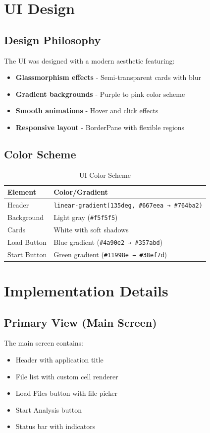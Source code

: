 \documentclass[12pt,a4paper]{report}
\begin{document}
\section{UI Design}

\subsection{Design Philosophy}
The UI was designed with a modern aesthetic featuring:
\begin{itemize}
    \item \textbf{Glassmorphism effects} - Semi-transparent cards with blur
    \item \textbf{Gradient backgrounds} - Purple to pink color scheme
    \item \textbf{Smooth animations} - Hover and click effects
    \item \textbf{Responsive layout} - BorderPane with flexible regions
\end{itemize}

\subsection{Color Scheme}
\begin{table}[H]
\centering
\begin{tabularx}{\textwidth}{|l|X|}
\hline
\textbf{Element} & \textbf{Color/Gradient} \\
\hline
Header & \texttt{linear-gradient(135deg, \#667eea → \#764ba2)} \\
\hline
Background & Light gray (\texttt{\#f5f5f5}) \\
\hline
Cards & White with soft shadows \\
\hline
Load Button & Blue gradient (\texttt{\#4a90e2 → \#357abd}) \\
\hline
Start Button & Green gradient (\texttt{\#11998e → \#38ef7d}) \\
\hline
\end{tabularx}
\caption{UI Color Scheme}
\end{table}

\section{Implementation Details}

\subsection{Primary View (Main Screen)}
The main screen contains:
\begin{itemize}
    \item Header with application title
    \item File list with custom cell renderer
    \item Load Files button with file picker
    \item Start Analysis button
    \item Status bar with indicators
\end{itemize}
\end{document}
